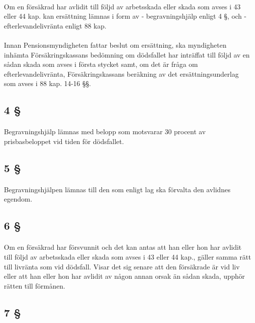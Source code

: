 \documentclass[a4paper,notitlepage,openany,10pt]{book}
\begin{document}
\paragraph*{}
Om en försäkrad har avlidit till följd av arbetsskada eller skada som avses i 43 eller 44 kap. kan ersättning lämnas i form av
\newline - begravningshjälp enligt 4 §, och
\newline - efterlevandelivränta enligt 88 kap.
\paragraph*{}
Innan Pensionsmyndigheten fattar beslut om ersättning, ska myndigheten inhämta Försäkringskassans bedömning om dödsfallet har inträffat till följd av en sådan skada som avses i första stycket samt, om det är fråga om efterlevandelivränta, Försäkringskassans beräkning av det ersättningsunderlag som avses i 88 kap. 14-16 §§.
\subsection*{4 §}
\paragraph*{}
Begravningshjälp lämnas med belopp som motsvarar 30 procent av prisbasbeloppet vid tiden för dödsfallet.
\subsection*{5 §}
\paragraph*{}
Begravningshjälpen lämnas till den som enligt lag ska förvalta den avlidnes egendom.
\subsection*{6 §}
\paragraph*{}
Om en försäkrad har försvunnit och det kan antas att han eller hon har avlidit till följd av arbetsskada eller skada som avses i 43 eller 44 kap., gäller samma rätt till livränta som vid dödsfall. Visar det sig senare att den försäkrade är vid liv eller att han eller hon har avlidit av någon annan orsak än sådan skada, upphör rätten till förmånen.
\subsection*{7 §}
\end{document}
